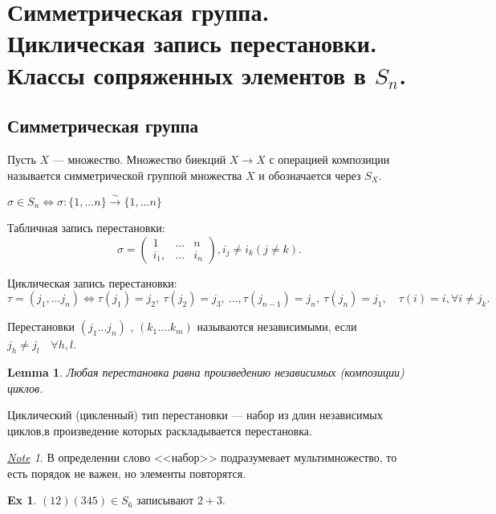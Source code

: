 \documentclass[11pt]{book}
\theoremstyle{definition}
\theoremstyle{plain}
\theoremstyle{plain}
\newtheorem{lm}{Lemma}
\theoremstyle{definition}
\newtheorem*{ex}{Ex}
\theoremstyle{remark}
\newtheorem*{note}{\underline{Note}}
\begin{document}
\section{Симметрическая группа. Циклическая запись перестановки. Классы сопряженных элементов в $ S_n$.}
\subsection{Симметрическая группа}
\begin{defn}
    Пусть $ X$ --- множество. Множество биекций  $ X \to  X$ с операцией композиции называется {симметрической группой} множества $ X$ и обозначается через  $ S_X$.
\end{defn}
\begin{defn}[Перестановка]
    $\sigma \in  S_n \Longleftrightarrow \sigma : \{1, \ldots n \} \stackrel{\sim} \to  \{1, \ldots n\}$
    \begin{description}
	\item
	    Табличная запись перестановки:
	    \[
		\sigma  = \left (
		    \begin{array}{ccc}
			1 &\ldots& n \\
			i_1, & \ldots  & i_n
		    \end{array}
		\right ), i_j \ne i_k (j \ne k)
	    .\]
	\item Циклическая запись перестановки:
	    \[
		\tau = (j_1, \ldots j_n) \Longleftrightarrow
		\tau(j_1) = j_2, ~ \tau(j_2) = j_3, ~ \ldots , \tau(j_{n-1}) = j_n, ~ \tau(j_n) = j_1, \quad \tau(i) = i, \forall i \ne j_k
	    .\]
    \end{description}
\end{defn}
\begin{defn}
    Перестановки     $(j_1 \ldots j_n)$ , $(k_1 \ldots .k_m)$ называются  {\sf независимыми}, если $j_h \ne j_l \quad \forall h, l$.
\end{defn}
\begin{lm}
    Любая перестановка равна произведению независимых (композиции) циклов.
\end{lm}
\begin{defn}
    {\sf Циклический (цикленный) тип перестановки} --- набор из длин независимых циклов,в произведение которых раскладывается перестановка.
\end{defn}
\begin{note}
    В определении слово <<набор>> подразумевает мультимножество, то есть порядок не важен, но элементы повторятся.
\end{note}
\begin{ex}
    $(12) (345) \in  S_6$ записывают $2 + 3$.
\end{ex}
\end{document}
